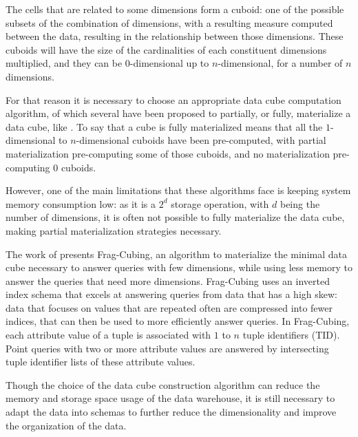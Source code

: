 The cells that are related to some dimensions form a cuboid: one of the possible subsets of the combination of dimensions, with a resulting measure computed between the data, resulting in the relationship between those dimensions.
These cuboids will have the size of the cardinalities of each constituent dimensions multiplied, and they can be 0-dimensional up to \(n\)-dimensional, for a number of \(n\) dimensions.

For that reason it is necessary to choose an appropriate data cube computation algorithm, of which several have been proposed to partially, or fully, materialize a data cube, like \cite{dokaBrownDwarfFullydistributed2011,dongxinCCubingEfficientComputation2006,liSemiClosedCubeEffective2005,liHighdimensionalOLAPMinimal2004,xinComputingIcebergCubes2007}.
To say that a cube is fully materialized means that all the \(1\)-dimensional to \(n\)-dimensional cuboids have been pre-computed, with partial materialization pre-computing some of those cuboids, and no materialization pre-computing $0$ cuboids.

However, one of the main limitations that these algorithms face is keeping system memory consumption low: as it is a $2^d$ storage operation, with $d$ being the number of dimensions, it is often not possible to fully materialize the data cube, making partial materialization strategies necessary.

The work of  presents Frag-Cubing, an algorithm to materialize the minimal data cube necessary to answer queries with few dimensions, while using less memory to answer the queries that need more dimensions.
Frag-Cubing uses an inverted index schema that excels at answering queries from data that has a high skew: data that focuses on values that are repeated often are compressed into fewer indices, that can then be used to more efficiently answer queries.
In Frag-Cubing, each attribute value of a tuple is associated with $1$ to $n$ tuple identifiers (TID).
Point queries with two or more attribute values are answered by intersecting tuple identifier lists of these attribute values.

Though the choice of the data cube construction algorithm can reduce the memory and storage space usage of the data warehouse, it is still necessary to adapt the data into schemas to further reduce the dimensionality and improve the organization of the data.

